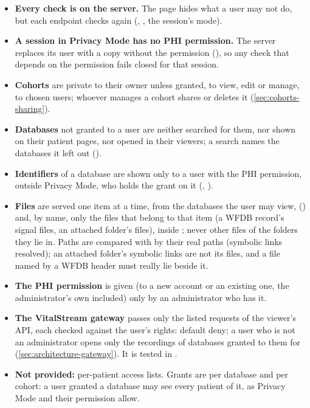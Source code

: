 \begin{itemize}
\item \textbf{Every check is on the server.} The page hides what a user may not do, but each
  endpoint checks again (, , the session's mode).
\item \textbf{A session in Privacy Mode has no PHI permission.} The server replaces its user with
  a copy without the permission (), so any check that depends on
  the permission fails closed for that session.
\item \textbf{Cohorts} are private to their owner unless granted, to view, edit or manage, to
  chosen users; whoever manages a cohort shares or deletes it (\cref{sec:cohorts-sharing}).
\item \textbf{Databases} not granted to a user are neither searched for them, nor shown on their
  patient pages, nor opened in their viewers; a search names the databases it left out
  ().
\item \textbf{Identifiers} of a database are shown only to a user with the PHI permission, outside
  Privacy Mode, who holds the  grant on it (,
  ).
\item \textbf{Files} are served one item at a time, from the databases the user may view, () and, by
  name, only the files that belong to that item (a WFDB record's signal files, an attached
  folder's files), inside ; never other files of the folders they lie in. Paths
  are compared with  by their real paths (symbolic links resolved); an attached
  folder's symbolic links are not its files, and a file named by a WFDB header must really lie
  beside it.
\item \textbf{The PHI permission} is given (to a new account or an existing one, the
  administrator's own included) only by an administrator who has it.
\item \textbf{The VitalStream gateway} passes only the listed requests of the viewer's API, each
  checked against the user's rights: default deny; a user who is not an administrator opens only
  the recordings of databases granted to them for  (\cref{sec:architecture-gateway}).
  It is tested in .
\item \textbf{Not provided:} per-patient access lists. Grants are per database and per cohort: a
  user granted a database may see every patient of it, as Privacy Mode and their permission
  allow.
\end{itemize}

